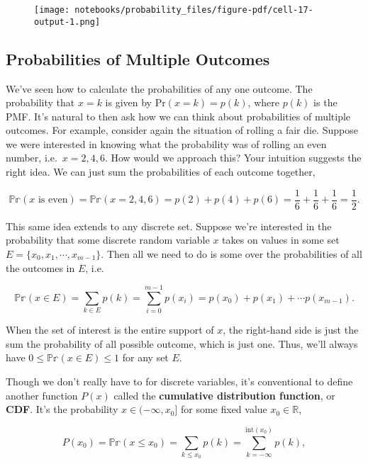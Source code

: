 \documentclass[
  letterpaper,
  DIV=11,
  numbers=noendperiod]{scrreprt}
\begin{document}
\begin{figure}[H]

{\centering \texttt{[image: notebooks/probability\_files/figure-pdf/cell-17-output-1.png]}

}

\end{figure}

\hypertarget{probabilities-of-multiple-outcomes}{%
\subsection{Probabilities of Multiple
Outcomes}\label{probabilities-of-multiple-outcomes}}

We've seen how to calculate the probabilities of any one outcome. The
probability that \(x=k\) is given by \(\text{Pr}(x=k) = p(k)\), where
\(p(k)\) is the PMF. It's natural to then ask how we can think about
probabilities of multiple outcomes. For example, consider again the
situation of rolling a fair die. Suppose we were interested in knowing
what the probability was of rolling an even number, i.e.~\(x=2,4,6\).
How would we approach this? Your intuition suggests the right idea. We
can just sum the probabilities of each outcome together,

\[\mathbb{Pr}(x\text{ is even}) = \mathbb{Pr}(x=2,4,6) = p(2) + p(4) + p(6) = \frac{1}{6} + \frac{1}{6} + \frac{1}{6} = \frac{1}{2}.\]

This same idea extends to any discrete set. Suppose we're interested in
the probability that some discrete random variable \(x\) takes on values
in some set \(E = \{x_0, x_1, \cdots, x_{m-1}\}\). Then all we need to
do is some over the probabilities of all the outcomes in \(E\), i.e.

\[\mathbb{Pr}(x \in E) = \sum_{k \in E} p(k) = \sum_{i=0}^{m-1} p(x_i) = p(x_0) + p(x_1) + \cdots p(x_{m-1}).\]

When the set of interest is the entire support of \(x\), the right-hand
side is just the sum the probability of all possible outcome, which is
just one. Thus, we'll always have \(0 \leq \mathbb{Pr}(x \in E) \leq 1\)
for any set \(E\).

Though we don't really have to for discrete variables, it's conventional
to define another function \(P(x)\) called the \textbf{cumulative
distribution function}, or \textbf{CDF}. It's the probability
\(x \in (-\infty, x_0]\) for some fixed value \(x_0 \in \mathbb{R}\),

\[P(x_0) = \mathbb{Pr}(x \leq x_0) = \sum_{k \leq x_0} p(k) = \sum_{k=-\infty}^{\text{int}(x_0)} p(k),\]
\end{document}
